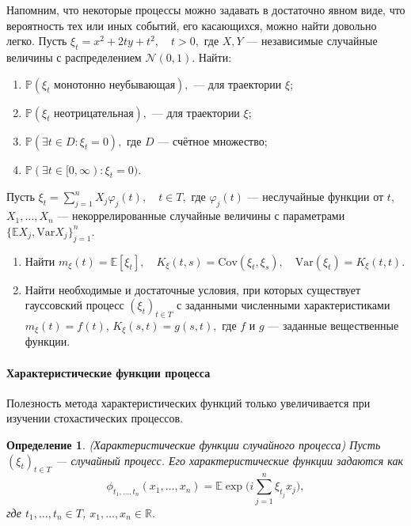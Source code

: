 \documentclass[10pt]{article}
\newtheorem{defn}[thm]{Определение}
\theoremstyle{boldnormal}
\theoremstyle{boldremark}
\newenvironment{zadachsem}
  {\pushQED{\qed}\renewcommand{\qedsymbol}{$\triangleleft$}\zadachsemm}
  {\popQED\endzadachsemm}
\begin{document}
Напомним, что некоторые процессы можно задавать в достаточно явном виде, что вероятность
тех или иных событий, его касающихся, можно найти довольно легко.
\begin{zadachsem}\label{zads:4puntkasvojstva} Пусть $
\xi_t = x^2 + 2 t y + t^2, \quad t > 0,
$ 
где $X, Y$ — независимые случайные величины с распределением $\mathcal{N}(0,1)$.
Найти: 
\begin{enumerate}
    \item $\mathbb{P}(\xi_t \text{ монотонно неубывающая}),$ — для траектории $\xi$;
    \item $\mathbb{P}(\xi_t \text{ неотрицательная}),$ — для траектории $\xi$;
    \item $\mathbb{P}(\exists t \in D : \xi_t = 0),$ где $D$ — счётное множество;
    \item $\mathbb{P}(\exists t \in [0, \infty) : \xi_t = 0).$
\end{enumerate}
\end{zadachsem}
\begin{zadachsem}\label{zads:lincombs1}
Пусть $\xi_t = \sum_{j=1}^{n} X_j \varphi_j(t), \quad t \in T,$
где $\varphi_j(t)$ — неслучайные функции от $t$,  
$X_1, \dots, X_n$ — некоррелированные случайные величины с параметрами $\{ \mathbb{E} X_j, \mathrm{Var} X_j \}_{j=1}^n.$
\begin{enumerate}
\item Найти $m_\xi(t) = \mathbb{E}[\xi_t], \quad 
K_\xi(t,s) = \mathrm{Cov}(\xi_t, \xi_s), \quad 
\mathrm{Var}(\xi_t) = K_\xi(t,t).$
\item Найти необходимые и достаточные условия,
при которых существует гауссовский процесс $(\xi_t)_{t \in T}$ с
заданными численными характеристиками $m_\xi(t) = f(t)$, $K_\xi(s,t)
= g(s,t),$ где $f$ и $g$ — заданные вещественные функции.
\end{enumerate}
\end{zadachsem}

\paragraph{Характеристические функции процесса}

Полезность метода характеристических функций только увеличивается при изучении 
стохастических процессов. 
\begin{defn}(Характеристические функции случайного процесса)
Пусть $(\xi_t)_{t \in T}$ — случайный процесс. Его характеристические функции задаются как
\[
\phi_{t_1, \dots, t_n}(x_1, \dots, x_n) = 
\mathbb{E} \exp\Big(i \sum_{j=1}^n \xi_{t_j} x_j \Big),
\]
где $t_1, \dots, t_n \in T$, $x_1, \dots, x_n \in \mathbb{R}$.
\end{defn}
\end{document}
